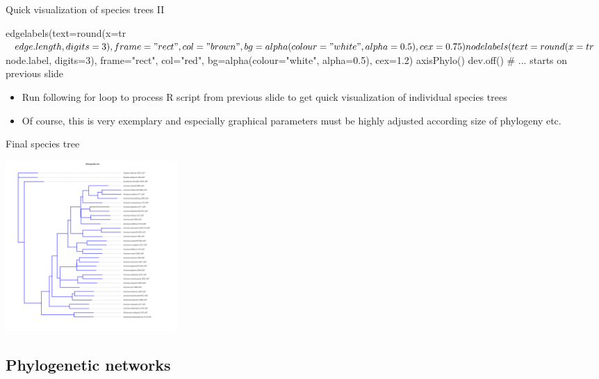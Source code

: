 \documentclass[compress,  xelatex, 11pt, xcolor=x11names, aspectratio=169,
	hyperref={
		bookmarks=true,
		unicode=true,
		colorlinks=true,
		pdftitle={HybSeq course},
		plainpages=false,
		pdfauthor={Vojtech Zeisek},
		pdfsubject={Practical processing of HybSeq target enrichment sequencing data on computing grids like MetaCentrum},
		pdfcreator={XeLaTeX},
		pdfkeywords={BASH, command line, GNU, HybSeq, Linux, MetaCentrum, sequencing shell, target enrichment},
		linkcolor=Turquoise4, %
		anchorcolor=DodgerBlue4, %
		citecolor=DodgerBlue4, %
		filecolor=DodgerBlue4, %
		menucolor=Tan4, %
		urlcolor=DarkOliveGreen4 %
		},
	url={hyphens, lowtilde} %
	]{beamer}
\renewcommand{\texttt}[1]{\colorbox{Cornsilk2}{{\ttfamily #1}}}
\begin{document}
\begin{frame}[fragile]{Quick visualization of species trees II}
	\begin{spluscode}
      edgelabels(text=round(x=tr$edge.length, digits=3), frame="rect",
        col="brown", bg=alpha(colour="white", alpha=0.5), cex=0.75)
      nodelabels(text=round(x=tr$node.label, digits=3), frame="rect",
        col="red", bg=alpha(colour="white", alpha=0.5), cex=1.2)
      axisPhylo()
      dev.off() # ... starts on previous slide
	\end{spluscode}
	\begin{itemize}
		\item Run following \texttt{for} loop to process \texttt{R} script from previous slide to get quick visualization of individual species trees
		\item Of course, this is very exemplary and especially graphical parameters must be highly adjusted according size of phylogeny etc.
	\end{itemize}
\end{frame}

\begin{frame}{Final species tree}
	\begin{center}
		\includegraphics[height=6.5cm]{sp_treeshrink_exons_good.png}
	\end{center}
\end{frame}

\subsection{Phylogenetic networks}
\end{document}
